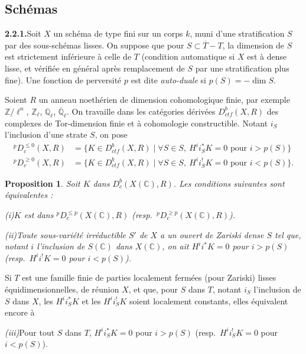 \documentclass[12pt,a4paper]{article}
\theoremstyle{plain}
\newtheorem{proposition}[theorem]{Proposition}
\theoremstyle{definition}
\begin{document}
\subsection{Sch\'emas}

\noindent\textbf{2.2.1.}\quad Soit $X$ un sch\'ema de type fini sur un corps $k$, muni d'une stratification $S$ par des sous-sch\'emas lisses. On suppose que pour $S \subset \overline{T} - T$, la dimension de $S$ est strictement inf\'erieure \`a celle de $T$ (condition automatique si $X$ est \`a dense lisse, et v\'erifi\'ee en g\'en\'eral apr\`es remplacement de $S$ par une stratification plus fine). Une fonction de perversit\'e $p$ est dite \emph{auto-duale} si $p(S) = -\dim S$.

Soient $R$ un anneau noeth\'erien de dimension cohomologique finie, par exemple $\mathbb{Z}/\ell^n$, $\mathbb{Z}_\ell$, $\mathbb{Q}_\ell$, $\overline{\mathbb{Q}}_\ell$. On travaille dans les cat\'egories d\'eriv\'ees $D_{ctf}^b(X, R)$ des complexes de Tor-dimension finie et \`a cohomologie constructible. Notant $i_S$ l'inclusion d'une strate $S$, on pose
\begin{align*}
{}^p D_c^{\leqslant 0}(X, R) &= \{K \in D_{ctf}^b(X, R) \mid \forall S \in S,\ H^i i_S^* K = 0 \text{ pour } i > p(S)\}\\
{}^p D_c^{\geqslant 0}(X, R) &= \{K \in D_{ctf}^b(X, R) \mid \forall S \in S,\ H^i i_S^! K = 0 \text{ pour } i < p(S)\}.
\end{align*}

\begin{proposition}\label{prop:2.2.2}
Soit $K$ dans $D_c^b(X(\mathbb{C}), R)$. Les conditions suivantes sont \'equivalentes :

\emph{(i)}\quad $K$ est dans ${}^p D_c^{\leqslant p}(X(\mathbb{C}), R)$ (resp.\ ${}^p D_c^{\geqslant p}(X(\mathbb{C}), R)$).

\emph{(ii)}\quad Toute sous-vari\'et\'e irr\'eductible $S'$ de $X$ a un ouvert de Zariski dense $S$ tel que, notant $i$ l'inclusion de $S(\mathbb{C})$ dans $X(\mathbb{C})$, on ait $H^i i^* K = 0$ pour $i > p(S)$ (resp.\ $H^i i^! K = 0$ pour $i < p(S)$).
\end{proposition}

Si $T$ est une famille finie de parties localement ferm\'ees (pour Zariski) lisses \'equidimensionnelles, de r\'eunion $X$, et que, pour $S$ dans $T$, notant $i_S$ l'inclusion de $S$ dans $X$, les $H^i i_S^* K$ et les $H^i i_S^! K$ soient localement constants, elles \'equivalent encore \`a

\emph{(iii)}\quad Pour tout $S$ dans $T$, $H^i i_S^* K = 0$ pour $i > p(S)$ (resp.\ $H^i i_S^! K = 0$ pour $i < p(S)$).
\end{document}
